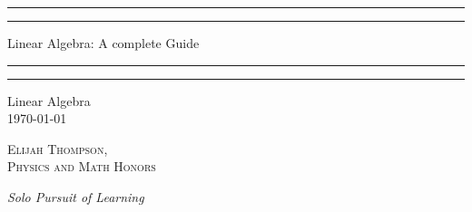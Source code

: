 \documentclass[12pt, a4paper, oneside, openright, titlepage]{book}
\begin{document}

\begin{titlepage}
    \centering
    \scshape
    \vspace*{\baselineskip}
    \rule{\textwidth}{1.6pt}\vspace*{-\baselineskip}\vspace*{2pt}
    \rule{\textwidth}{0.4pt}
    
    \vspace{0.75\baselineskip}
    
    {\LARGE Linear Algebra: A complete Guide}
    
    \vspace{0.75\baselineskip}
    
    \rule{\textwidth}{0.4pt}\vspace*{-\baselineskip}\vspace{3.2pt}
    \rule{\textwidth}{1.6pt}
    
    \vspace{2\baselineskip}
    Linear Algebra \\
    \vspace*{3\baselineskip}
    \monthdayyeardate\today \\
    \vspace*{5.0\baselineskip}
    
    {\scshape\Large Elijah Thompson, \\ Physics and Math Honors\\}
    
    \vspace{1.0\baselineskip}
    \textit{Solo Pursuit of Learning}
    \vfill
    \enlargethispage{1in}
    \begin{figure}[b!]
    \end{figure}
\end{titlepage}
\end{document}
